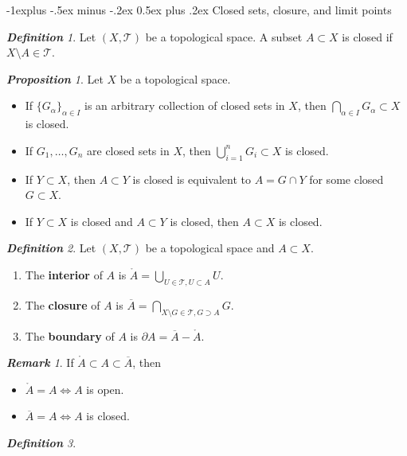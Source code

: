 \documentclass[frenchspacing,9pt,landscape,a4paper]{article}
\makeatletter
\renewcommand{\subsection}{\@startsection{subsection}{2}{0mm}%
                                {-1explus -.5ex minus -.2ex}%
                                {0.5ex plus .2ex}%
                                {\normalfont\normalsize\bfseries}}
\theoremstyle{remark}
\newtheorem*{defn}{\textbf{Definition}}
\newtheorem*{prop}{\textbf{Proposition}}
\newtheorem*{rem}{\textbf{Remark}}
\makeatother
\begin{document}
\begin{multicols}{4}
\subsection{Closed sets, closure, and limit points}
\begin{defn}
    Let $(X,\mathcal{T})$ be a topological space. A subset  $A\subset X$ is closed if  $X\setminus
    A\in\mathcal{T}$.
\end{defn}
\begin{prop}
    Let $X$ be a topological space.
     \begin{itemize}
         \item If $\{G_\alpha\}_{\alpha\in I}$ is an arbitrary collection of closed sets in  $X$, then
             $\bigcap_{\alpha\in I}G_\alpha\subset X$ is closed.
         \item If  $G_1,\dots,G_n$ are closed sets in $X$, then $\bigcup_{i=1}^n G_i\subset X$ is closed.
         \item If  $Y\subset X$, then  $A\subset Y$ is closed is equivalent to  $A=G\cap Y$ for some closed
              $G\subset X$.
         \item If $Y\subset X$ is closed and  $A\subset Y$ is closed, then  $A\subset X$ is closed.
    \end{itemize}
\end{prop}
\begin{defn}
    Let $(X,\mathcal{T})$ be a topological space and  $A\subset X$.
     \begin{enumerate}
         \item The \textbf{interior} of $A$ is  $\mathring{A}=\bigcup_{U\in\mathcal{T},U\subset A}U$.
         \item The \textbf{closure} of  $A$ is  $\overline{A}=\bigcap_{X\setminus
             G\in\mathcal{T},G\supset A}G$.
         \item The \textbf{boundary} of  $A$ is  $\partial A=\overline{A}-\mathring{A}$.
    \end{enumerate}
\end{defn}
\begin{rem}
    If $\mathring{A}\subset A\subset\overline{A}$, then
     \begin{itemize}
         \item $\mathring{A}=A\iff A$ is open.
         \item  $\overline{A}=A\iff A$ is closed.
    \end{itemize}
\end{rem}
\begin{defn}

\end{defn}
\end{multicols}
\end{document}
